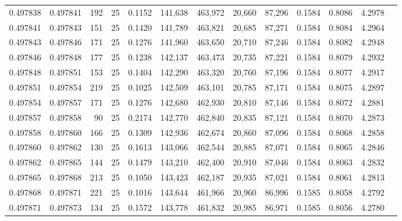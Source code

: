 \begin{tabular}{rrrrrrrrrrrrr}
0.497838 & 0.497841 & 192 &  25 &                                     0.1152 & 141,638 & 463,972 &  20,660 &  87,296 & 0.1584 & 0.8086 & 4.2978 \\
0.497841 & 0.497843 & 151 &  25 &                                     0.1420 & 141,789 & 463,821 &  20,685 &  87,271 & 0.1584 & 0.8084 & 4.2964 \\
0.497843 & 0.497846 & 171 &  25 &                                     0.1276 & 141,960 & 463,650 &  20,710 &  87,246 & 0.1584 & 0.8082 & 4.2948 \\
0.497846 & 0.497848 & 177 &  25 &                                     0.1238 & 142,137 & 463,473 &  20,735 &  87,221 & 0.1584 & 0.8079 & 4.2932 \\
0.497848 & 0.497851 & 153 &  25 &                                     0.1404 & 142,290 & 463,320 &  20,760 &  87,196 & 0.1584 & 0.8077 & 4.2917 \\
0.497851 & 0.497854 & 219 &  25 &                                     0.1025 & 142,509 & 463,101 &  20,785 &  87,171 & 0.1584 & 0.8075 & 4.2897 \\
0.497854 & 0.497857 & 171 &  25 &                                     0.1276 & 142,680 & 462,930 &  20,810 &  87,146 & 0.1584 & 0.8072 & 4.2881 \\
0.497857 & 0.497858 &  90 &  25 &                                     0.2174 & 142,770 & 462,840 &  20,835 &  87,121 & 0.1584 & 0.8070 & 4.2873 \\
0.497858 & 0.497860 & 166 &  25 &                                     0.1309 & 142,936 & 462,674 &  20,860 &  87,096 & 0.1584 & 0.8068 & 4.2858 \\
0.497860 & 0.497862 & 130 &  25 &                                     0.1613 & 143,066 & 462,544 &  20,885 &  87,071 & 0.1584 & 0.8065 & 4.2846 \\
0.497862 & 0.497865 & 144 &  25 &                                     0.1479 & 143,210 & 462,400 &  20,910 &  87,046 & 0.1584 & 0.8063 & 4.2832 \\
0.497865 & 0.497868 & 213 &  25 &                                     0.1050 & 143,423 & 462,187 &  20,935 &  87,021 & 0.1584 & 0.8061 & 4.2813 \\
0.497868 & 0.497871 & 221 &  25 &                                     0.1016 & 143,644 & 461,966 &  20,960 &  86,996 & 0.1585 & 0.8058 & 4.2792 \\
0.497871 & 0.497873 & 134 &  25 &                                     0.1572 & 143,778 & 461,832 &  20,985 &  86,971 & 0.1585 & 0.8056 & 4.2780 \\

\end{tabular}
